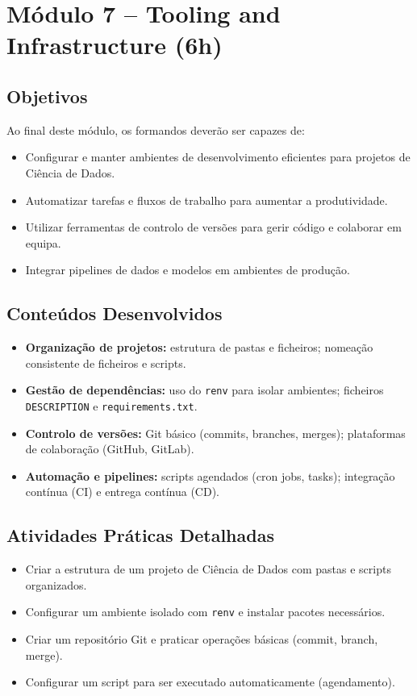 \section{\textcolor{sectionred}{Módulo 7 – Tooling and Infrastructure (6h)}}

\subsection{\textcolor{subsectionblue}{Objetivos}}
Ao final deste módulo, os formandos deverão ser capazes de:
\begin{itemize}
  \item Configurar e manter ambientes de desenvolvimento eficientes para projetos de Ciência de Dados.  
  \item Automatizar tarefas e fluxos de trabalho para aumentar a produtividade.  
  \item Utilizar ferramentas de controlo de versões para gerir código e colaborar em equipa.  
  \item Integrar pipelines de dados e modelos em ambientes de produção.
\end{itemize}

\subsection{\textcolor{subsectionblue}{Conteúdos Desenvolvidos}}
\begin{itemize}
  \item \textbf{Organização de projetos:} estrutura de pastas e ficheiros; nomeação consistente de ficheiros e scripts.
  \item \textbf{Gestão de dependências:} uso do \texttt{renv} para isolar ambientes; ficheiros \texttt{DESCRIPTION} e \texttt{requirements.txt}.
  \item \textbf{Controlo de versões:} Git básico (commits, branches, merges); plataformas de colaboração (GitHub, GitLab).
  \item \textbf{Automação e pipelines:} scripts agendados (cron jobs, tasks); integração contínua (CI) e entrega contínua (CD).
\end{itemize}

\subsection{\textcolor{subsectionblue}{Atividades Práticas Detalhadas}}
\begin{itemize}
  \item Criar a estrutura de um projeto de Ciência de Dados com pastas e scripts organizados.
  \item Configurar um ambiente isolado com \texttt{renv} e instalar pacotes necessários.
  \item Criar um repositório Git e praticar operações básicas (commit, branch, merge).
  \item Configurar um script para ser executado automaticamente (agendamento).
\end{itemize}

